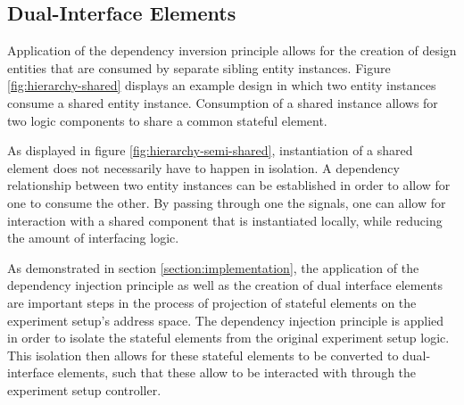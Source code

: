\documentclass{article}
\begin{document}
\subsection{Dual-Interface Elements}
Application of the dependency inversion principle allows for the creation of design entities that are consumed by separate sibling entity instances. Figure \ref{fig:hierarchy-shared} displays an example design in which two entity instances consume a shared entity instance. Consumption of a shared instance allows for two logic components to share a common stateful element. 

As displayed in figure \ref{fig:hierarchy-semi-shared}, instantiation of a shared element does not necessarily have to happen in isolation. A dependency relationship between two entity instances can be established in order to allow for one to consume the other. By passing through one the signals, one can allow for interaction with a shared component that is instantiated locally, while reducing the amount of interfacing logic. 

As demonstrated in section \ref{section:implementation}, the application of the dependency injection principle as well as the creation of dual interface elements are important steps in the process of projection of stateful elements on the experiment setup's address space. The dependency injection principle is applied in order to isolate the stateful elements from the original experiment setup logic. This isolation then allows for these stateful elements to be converted to dual-interface elements, such that these allow to be interacted with through the experiment setup controller.
\end{document}
